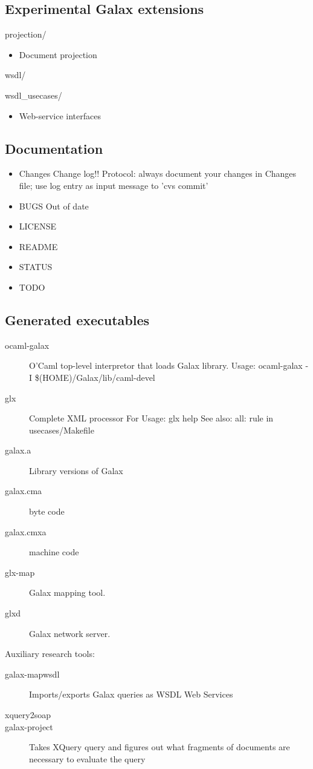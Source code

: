 \subsection{Experimental Galax extensions}

projection/ 
\begin{itemize}
\item   Document projection 
\end{itemize}

wsdl/    

wsdl\_usecases/
\begin{itemize}
\item   Web-service interfaces
\end{itemize}

\subsection{Documentation}
\begin{itemize}
\item Changes     
  Change log!! 
  Protocol: always document your changes in Changes file; use log
    entry as input message to 'cvs commit'

\item BUGS	    
  Out of date

\item LICENSE	 
\item README	 
\item STATUS	    
\item TODO	    
\end{itemize}


\subsection{Generated executables}
\begin{description}
\item[ocaml-galax] O'Caml top-level interpretor that loads Galax library.
               Usage:
               ocaml-galax -I \$(HOME)/Galax/lib/caml-devel

\item[glx] Complete XML processor
               For Usage:
               glx help
               See also: 
               all: rule in usecases/Makefile

\item[galax.a]       Library versions of Galax
\item[galax.cma]     byte code
\item[galax.cmxa]    machine code

\item[glx-map] Galax mapping tool.

\item[glxd] Galax network server.
\end{description}

Auxiliary research tools:
\begin{description}
\item[galax-mapwsdl]Imports/exports Galax queries as WSDL Web Services
\item[xquery2soap]

\item[galax-project] Takes XQuery query and figures out what fragments of
                documents are necessary to evaluate the query
\end{description}

